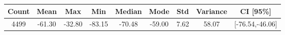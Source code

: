 \begin{tabular}{|c|c|c|c|c|c|c|c|c|}\hline
\rowcolor{Plum!20}
Count&Mean&Max&Min&Median&Mode&Std&Variance&CI [95\%]\\\hline\hline
4499&-61.30&-32.80&-83.15&-70.48&-59.00&7.62&58.07&[-76.54,-46.06]\\\hline
\end{tabular}
